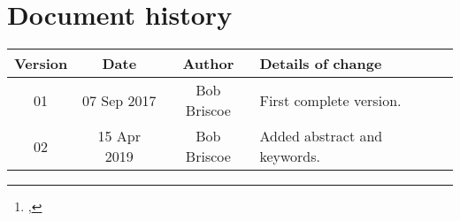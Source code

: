 \documentclass[a4paper,twoside,twocolumn]{article}
\title{\metatitle}%
\author{\metaauthori%
\thanks{\metamaili, %
\metaaddress}%
}
\date{\metadate}%
\newif\ifccs   %
\newcommand*{\metakeywords}{Data Communication, Networks, Internet, Control, Congestion Control, Quality of Service, Performance, Latency, Responsiveness, Dynamics, Algorithm, Standards, Active Queue Management, AQM, Sojourn time, Virtual queue, Explicit Congestion Notification, ECN, Gradient Marking, Ramp}
\newcommand*{\metaversion}{02}
\newcommand*{\metadate}{15 Apr 2019}
\begin{document}
%


\maketitle%
\thispagestyle{first}

\begin{abstract}
{\small\noindent%
}      %
\end{abstract}
\ifccs{}%
%
%
\subsection*{CCS Concepts}
\textbf{\textbullet Networks} \(\to\) \textbf{Cross-layer protocols; Network algorithms; Network dynamics;}
\subsubsection*{Keywords}
\metakeywords
%
\fi{}%


{}

{\footnotesize%
}


\onecolumn%
\section*{Document history}

\begin{tabular}{|c|c|c|p{3.5in}|}
 \hline
Version &Date &Author &Details of change \\
\hline\hline
01                      &07 Sep 2017   &Bob Briscoe &First complete version.\\\hline%
\metaversion &\metadate     &Bob Briscoe &Added abstract and keywords.\\\hline%
\hline%
\end{tabular}
\end{document}
